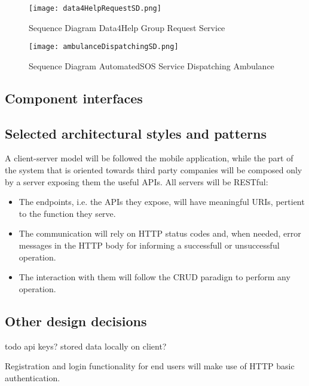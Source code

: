 \documentclass[../main.tex]{subfiles}
\begin{document}
\vspace*{2cm}

\begin{figure}[H]
        \centering
             \texttt{[image: data4HelpRequestSD.png]}
              \caption{Sequence Diagram Data4Help Group Request Service }
               \label{fig:data4HelpRequestSD}
\end{figure}

\vspace*{2cm}

\begin{figure}[H]
        \centering
             \texttt{[image: ambulanceDispatchingSD.png]}
              \caption{Sequence Diagram AutomatedSOS Service Dispatching Ambulance}
               \label{fig:ambulanceDispatchingSD}
\end{figure}

\subsection{Component interfaces}

\subsection{Selected architectural styles and patterns}

A client-server model will be followed the mobile application, while the part of the system that is oriented towards third party companies will be composed only by a server exposing them the useful APIs. All servers will be RESTful:
\begin{itemize}
	\item The endpoints, i.e. the APIs they expose, will have meaningful URIs, pertient to the function they serve.
	\item The communication will rely on HTTP status codes and, when needed, error messages in the HTTP body for informing a successfull or unsuccessful operation.
	\item The interaction with them will follow the CRUD paradign to perform any operation.
\end{itemize}


\subsection{Other design decisions}

todo api keys? stored data locally on client?

Registration and login functionality for end users will make use of HTTP basic authentication.
\end{document}

